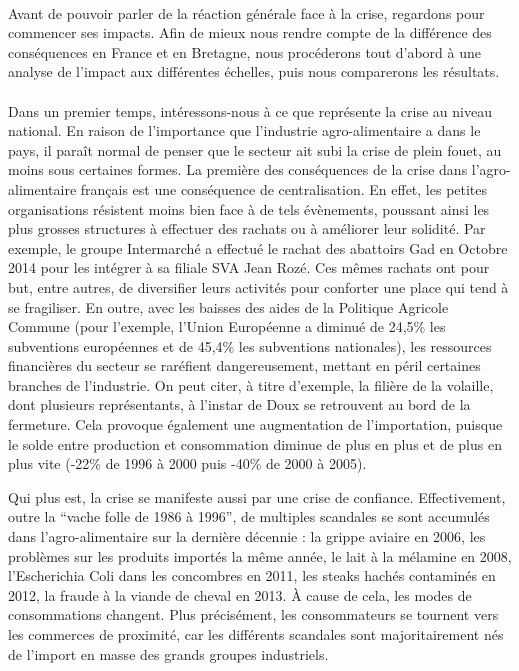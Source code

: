 \documentclass[a4paper,10pt]{report}
\begin{document}
			\paragraph{}Avant de pouvoir parler de la réaction générale face à la crise, regardons pour commencer ses impacts. Afin de mieux nous rendre compte de la différence des conséquences en France et en Bretagne, nous procéderons tout d'abord à une analyse de l'impact aux différentes échelles, puis nous comparerons les résultats.

			\paragraph{}Dans un premier temps, intéressons-nous à ce que représente la crise au niveau national. En raison de l'importance que l'industrie agro-alimentaire a dans le pays, il paraît normal de penser que le secteur ait subi la crise de plein fouet, au moins sous certaines formes. La première des conséquences de la crise dans l'agro-alimentaire français est une conséquence de centralisation. En effet, les petites organisations résistent moins bien face à de tels évènements, poussant ainsi les plus grosses structures à effectuer des rachats ou à améliorer leur solidité. Par exemple, le groupe Intermarché a effectué le rachat des abattoirs Gad en Octobre 2014 pour les intégrer à sa filiale SVA Jean Rozé. Ces mêmes rachats ont pour but, entre autres, de diversifier leurs activités pour conforter une place qui tend à se fragiliser. En outre, avec les baisses des aides de la Politique Agricole Commune (pour l’exemple, l’Union Européenne a diminué de 24,5\% les subventions européennes et de 45,4\% les subventions nationales), les ressources financières du secteur se raréfient dangereusement, mettant en péril certaines branches de l’industrie. On peut citer, à titre d’exemple, la filière de la volaille, dont plusieurs représentants, à l’instar de Doux se retrouvent au bord de la fermeture. Cela provoque également une augmentation de l’importation, puisque le solde entre production et consommation diminue de plus en plus et de plus en plus vite (-22\% de 1996 à 2000 puis -40\% de 2000 à 2005).

			Qui plus est, la crise se manifeste aussi par une crise de confiance. Effectivement, outre la “vache folle de 1986 à 1996”, de multiples scandales se sont accumulés dans l’agro-alimentaire sur la dernière décennie : la grippe aviaire en 2006, les problèmes sur les produits importés la même année, le lait à la mélamine en 2008, l’Escherichia Coli dans les concombres en 2011, les steaks hachés contaminés en 2012, la fraude à la viande de cheval en 2013. À cause de cela, les modes de consommations changent. Plus précisément, les consommateurs se tournent vers les commerces de proximité, car les différents scandales sont majoritairement nés de l’import en masse des grands groupes industriels.
			
\end{document}
